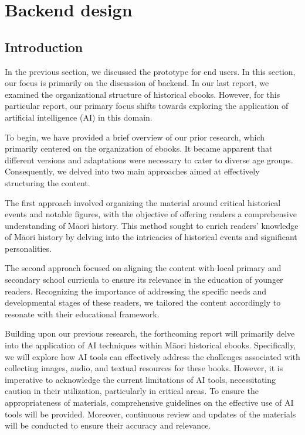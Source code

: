 \chapter{Backend design} 

\section{Introduction}
In the previous section, we discussed the prototype for end users. 
In this section, our focus is primarily on the discussion of backend.
In our last report, we examined the organizational structure of historical ebooks. 
However, for this particular report, our primary focus shifts towards exploring the application of artificial intelligence (AI) in this domain.

To begin, we have provided a brief overview of our prior research, which primarily centered on the organization of ebooks. 
It became apparent that different versions and adaptations were necessary to cater to diverse age groups. 
Consequently, we delved into two main approaches aimed at effectively structuring the content.

The first approach involved organizing the material around critical historical events and notable figures, with the objective of offering readers a comprehensive understanding of Māori history. 
This method sought to enrich readers' knowledge of Māori history by delving into the intricacies of historical events and significant personalities.

The second approach focused on aligning the content with local primary and secondary school curricula to ensure its relevance in the education of younger readers. 
Recognizing the importance of addressing the specific needs and developmental stages of these readers, we tailored the content accordingly to resonate with their educational framework.

Building upon our previous research, the forthcoming report will primarily delve into the application of AI techniques within Māori historical ebooks. 
Specifically, we will explore how AI tools can effectively address the challenges associated with collecting images, audio, and textual resources for these books. 
However, it is imperative to acknowledge the current limitations of AI tools, necessitating caution in their utilization, particularly in critical areas. 
To ensure the appropriateness of materials, comprehensive guidelines on the effective use of AI tools will be provided. 
Moreover, continuous review and updates of the materials will be conducted to ensure their accuracy and relevance.

